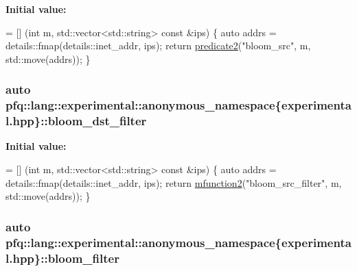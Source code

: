 {\bfseries Initial value\+:}
\begin{DoxyCode}
= [] (\textcolor{keywordtype}{int} m, std::vector<std::string> \textcolor{keyword}{const} &ips) \{
                                \textcolor{keyword}{auto} addrs = details::fmap(details::inet\_addr, ips);
                                \textcolor{keywordflow}{return} \hyperlink{namespacepfq_1_1lang_a7282b9a2e51359b8db0dcdb9fadf2fd1}{predicate2}(\textcolor{stringliteral}{"bloom\_src"}, m, std::move(addrs));
                          \}
\end{DoxyCode}
\hypertarget{namespacepfq_1_1lang_1_1experimental_1_1anonymous__namespace_02experimental_8hpp_03_abdc0622697144c772102af575575c07f}{
\subsubsection[{bloom\+\_\+dst\+\_\+filter}]{\setlength{\rightskip}{0pt plus 5cm}auto pfq\+::lang\+::experimental\+::anonymous\+\_\+namespace\{experimental.\+hpp\}\+::bloom\+\_\+dst\+\_\+filter}}\label{namespacepfq_1_1lang_1_1experimental_1_1anonymous__namespace_02experimental_8hpp_03_abdc0622697144c772102af575575c07f}
{\bfseries Initial value\+:}
\begin{DoxyCode}
= [] (\textcolor{keywordtype}{int} m, std::vector<std::string> \textcolor{keyword}{const} &ips) \{
                                    \textcolor{keyword}{auto} addrs = details::fmap(details::inet\_addr, ips);
                                    \textcolor{keywordflow}{return} \hyperlink{namespacepfq_1_1lang_aab1a000712bb2711044255ca1626cc84}{mfunction2}(\textcolor{stringliteral}{"bloom\_src\_filter"}, m, std::move(addrs));
                                \}
\end{DoxyCode}
\hypertarget{namespacepfq_1_1lang_1_1experimental_1_1anonymous__namespace_02experimental_8hpp_03_ab40aacc9b6fcf65e19fb1479e96da50a}{
\subsubsection[{bloom\+\_\+filter}]{\setlength{\rightskip}{0pt plus 5cm}auto pfq\+::lang\+::experimental\+::anonymous\+\_\+namespace\{experimental.\+hpp\}\+::bloom\+\_\+filter}}\label{namespacepfq_1_1lang_1_1experimental_1_1anonymous__namespace_02experimental_8hpp_03_ab40aacc9b6fcf65e19fb1479e96da50a}
